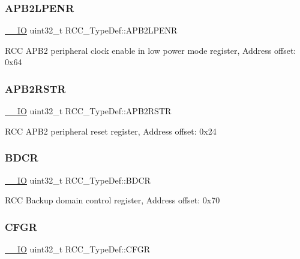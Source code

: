 \subsubsection{\texorpdfstring{A\+P\+B2\+L\+P\+E\+NR}{APB2LPENR}}
{\footnotesize\ttfamily \hyperlink{core__sc300_8h_aec43007d9998a0a0e01faede4133d6be}{\+\_\+\+\_\+\+IO} uint32\+\_\+t R\+C\+C\+\_\+\+Type\+Def\+::\+A\+P\+B2\+L\+P\+E\+NR}

R\+CC A\+P\+B2 peripheral clock enable in low power mode register, Address offset\+: 0x64 \mbox{\label{struct_r_c_c___type_def_a4491ab20a44b70bf7abd247791676a59}} 
\subsubsection{\texorpdfstring{A\+P\+B2\+R\+S\+TR}{APB2RSTR}}
{\footnotesize\ttfamily \hyperlink{core__sc300_8h_aec43007d9998a0a0e01faede4133d6be}{\+\_\+\+\_\+\+IO} uint32\+\_\+t R\+C\+C\+\_\+\+Type\+Def\+::\+A\+P\+B2\+R\+S\+TR}

R\+CC A\+P\+B2 peripheral reset register, Address offset\+: 0x24 \mbox{\label{struct_r_c_c___type_def_a05be375db50e8c9dd24fb3bcf42d7cf1}} 
\subsubsection{\texorpdfstring{B\+D\+CR}{BDCR}}
{\footnotesize\ttfamily \hyperlink{core__sc300_8h_aec43007d9998a0a0e01faede4133d6be}{\+\_\+\+\_\+\+IO} uint32\+\_\+t R\+C\+C\+\_\+\+Type\+Def\+::\+B\+D\+CR}

R\+CC Backup domain control register, Address offset\+: 0x70 \mbox{\label{struct_r_c_c___type_def_a0721b1b729c313211126709559fad371}} 
\subsubsection{\texorpdfstring{C\+F\+GR}{CFGR}}
{\footnotesize\ttfamily \hyperlink{core__sc300_8h_aec43007d9998a0a0e01faede4133d6be}{\+\_\+\+\_\+\+IO} uint32\+\_\+t R\+C\+C\+\_\+\+Type\+Def\+::\+C\+F\+GR}

